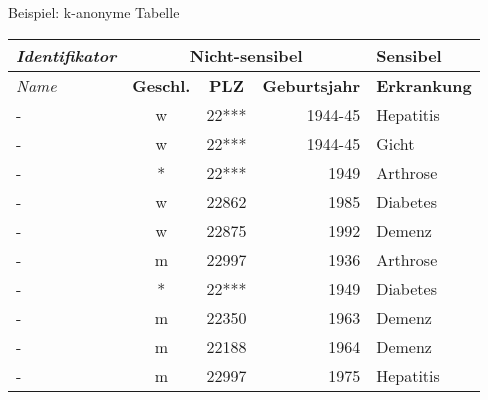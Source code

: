 \begin{frame}{Beispiel: k-anonyme Tabelle}
	\begin{center}
		\begin{tabular}{|l|c|c|r|l|}
		\hline \textit{Identifikator} & \multicolumn{3}{c|}{\textbf{Nicht-sensibel}} & \textbf{Sensibel} \\ 
		\hline \textit{Name} & \textbf{Geschl.} & \textbf{PLZ} & \textbf{Geburtsjahr} & \textbf{Erkrankung} \\ \hline
		\hline \rowcolor{svshellblau1!30} - & w & 22*** & 1944-45 & Hepatitis \\ 
		\hline \rowcolor{svshellblau1!30} - & w & 22*** & 1944-45 & Gicht \\
		\hline \rowcolor{svsgrau1!30} - & * & 22*** & 1949 & Arthrose \\ 
		\hline - & w & 22862 & 1985 & Diabetes \\ 
		\hline - & w & 22875 & 1992 & Demenz \\  
		\hline - & m & 22997 & 1936 & Arthrose \\ 
		\hline \rowcolor{svsgrau1!30}- & * & 22*** & 1949 & Diabetes \\ 
		\hline - & m & 22350 & 1963 & Demenz \\ 
		\hline - & m & 22188 & 1964 & Demenz \\ 
		\hline - & m & 22997 & 1975 & Hepatitis \\ 
		\hline 
		\end{tabular}
	\end{center}
\end{frame}

